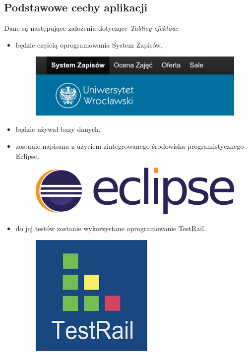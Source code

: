 \documentclass{article}
\begin{document}
\subsection{Podstawowe cechy aplikacji}
Dane są następujące założenia dotyczące \textit{Tablicy efektów}:
\begin{itemize}
  \item będzie częścią oprogramowania System Zapisów,
\begin{figure}[H]
	\begin{center}
		\includegraphics[scale=0.3]{syst.png}
	\end{center}
\end{figure}
 \item będzie używał bazy danych,
 \item zostanie napisana z użyciem zintegrowanego środowiska programistycznego Eclipse,
 \begin{figure}[H]
	\begin{center}
		\includegraphics[scale=0.12]{eclipse.png}
	\end{center}
\end{figure}
 \item do jej testów zostanie wykorzystane oprogramowanie TestRail.
 \begin{figure}[H]
	\begin{center}
		\includegraphics[scale=0.2]{testrail.png}
	\end{center}
\end{figure}
\end{itemize}
\end{document}
